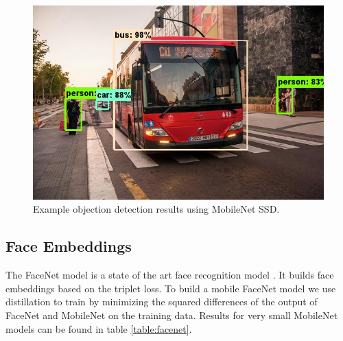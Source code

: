 \documentclass[10pt,twocolumn,letterpaper]{article}
\begin{document}
\begin{figure}
  \includegraphics[width=\linewidth]{mobilessd.jpg}
  \caption{Example objection detection results using MobileNet SSD.}
  \label{fig:detection}
\end{figure}

\subsection{Face Embeddings}
The FaceNet model is a state of the art face recognition model \cite{schroff2015facenet}. It builds face embeddings based on the triplet loss. To build a mobile FaceNet model we use distillation
to train by minimizing the squared differences of the output of FaceNet and MobileNet on the training data. Results for very small MobileNet models can be found in table \ref{table:facenet}.

\begin{table}[t]
  \caption{MobileNet Distilled from FaceNet} %
\centering %
\end{table}
\end{document}
